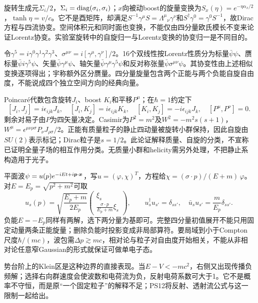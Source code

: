 旋转生成元$\Sigma_i/2$，$\Sigma_i=\operatorname{diag}(\sigma_i,\sigma_i)$；$x$向被动boost的旋量变换为$S_x(\eta)=e^{-\eta\alpha_x/2}$，$\tanh\eta=v/c$。它不是酉矩阵，却满足$S^{-1}\gamma^\mu S=\Lambda^\mu{}_{\nu}\gamma^\nu$和$S^\dagger\gamma^0=\gamma^0S^{-1}$，故Dirac方程与四流协变。空间体积元和同时面也变换，不能仅由四分量欧氏模长不变来论证Lorentz协变。实验室旋转中的自旋归一与Lorentz变换的协变归一是不同目的。

令$\gamma^5=i\gamma^0\gamma^1\gamma^2\gamma^3$、$\sigma^{\mu\nu}=i[\gamma^\mu,\gamma^\nu]/2$。16个双线性按Lorentz性质分为标量$\bar\psi\psi$、赝标量$\bar\psi i\gamma^5\psi$、矢量$\bar\psi\gamma^\mu\psi$、轴矢量$\bar\psi\gamma^\mu\gamma^5\psi$和反对称张量$\bar\psi\sigma^{\mu\nu}\psi$。其协变性由上述相似变换逐项得出；宇称额外区分赝量。四分量旋量包含两个正能与两个负能自旋自由度，不能说成四个独立空间方向的经典向量。

Poincaré代数包含旋转$J_i$、boost $K_i$和平移$P^\mu$；在$\hbar=1$约定下
\[
 [J_i,J_j]=i\epsilon_{ijk}J_k,\quad[J_i,K_j]=i\epsilon_{ijk}K_k,\quad
 [K_i,K_j]=-i\epsilon_{ijk}J_k,\quad[P^\mu,P^\nu]=0.
\]
剩余对易子由$P$为四矢量决定。Casimir为$P^2=m^2$及$W^2=-m^2s(s+1)$，$W^\mu=\epsilon^{\mu\nu\rho\sigma}P_\nu J_{\rho\sigma}/2$。正能有质量粒子的静止四动量被旋转小群保持，因此自旋由$SU(2)$表示标记；Dirac粒子是$s=1/2$。此论证解释质量、自旋的分类，不宣称已证明全量子场的相互作用分类。无质量小群和helicity需另外处理，不把静止系构造用于光子。

\par
\ifdim\dimexpr\pagegoal-\pagetotal\relax<5\baselineskip\newpage\fi
{}
平面波$\psi=u(p)e^{-iEt+i\boldsymbol{p}\cdot\boldsymbol{x}}$，写$u=(\varphi,\chi)^T$，方程给$\chi=(\sigma\cdot p)/(E+m)\,\varphi$。对$E=E_p=\sqrt{p^2+m^2}$可取
\[
 u_s(p)=\sqrt{\frac{E_p+m}{2E_p}}
 \begin{pmatrix}\xi_s\\\frac{\sigma\cdot p}{E_p+m}\xi_s\end{pmatrix},\qquad
 u_s^\dagger u_{s'}=\delta_{ss'},\quad\bar u_su_{s'}=\frac m{E_p}\delta_{ss'}.
\]
负能$E=-E_p$同样有两解，选下两分量为基即可。完整四分量初值展开不能只用固定动量两条正能旋量；删除负能时投影变成非局部算符。要局域到小于Compton尺度$\hbar/(mc)$，波包需$\Delta p\gtrsim mc$，相对论与粒子对自由度开始相关，不能从非相对论任意窄Gaussian的形式就保证可做单电子态。

势台阶上的Klein区是这种边界的直接表现。当$E-V<-mc^2$，右侧又出现传播负频解；选择右向群速度会使波数和电荷流为负，反射电荷系数可大于1。它不是概率不守恒，而是原“一个固定粒子”的解释不足；PS12将反射、透射流公式与这一限制一起给出。


